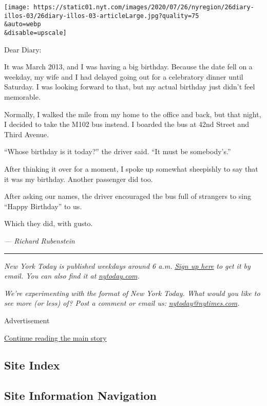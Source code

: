 \texttt{[image: https://static01.nyt.com/images/2020/07/26/nyregion/26diary-illos-03/26diary-illos-03-articleLarge.jpg?quality=75\\\&auto=webp\\\&disable=upscale]}

Dear Diary:

It was March 2013, and I was having a big birthday. Because the date
fell on a weekday, my wife and I had delayed going out for a celebratory
dinner until Saturday. I was looking forward to that, but my actual
birthday just didn't feel memorable.

Normally, I walked the mile from my home to the office and back, but
that night, I decided to take the M102 bus instead. I boarded the bus at
42nd Street and Third Avenue.

``Whose birthday is it today?'' the driver said. ``It must be
somebody's.''

After thinking it over for a moment, I spoke up somewhat sheepishly to
say that it was my birthday. Another passenger did too.

After asking our names, the driver encouraged the bus full of strangers
to sing ``Happy Birthday'' to us.

Which they did, with gusto.

\emph{--- Richard Rubenstein}

\begin{center}\rule{0.5\linewidth}{\linethickness}\end{center}

\emph{New York Today is published weekdays around 6 a.m.}
\href{https://www.nytimes.com/newsletters/newyorktoday?module=inline}{\emph{Sign
up here}} \emph{to get it by email. You can also find it at}
\href{http://www.nytoday.com/}{\emph{nytoday.com}}\emph{.}

\emph{We're experimenting with the format of New York Today. What would
you like to see more (or less) of? Post a comment or email us:}
\href{mailto:nytoday@nytimes.com}{\emph{nytoday@nytimes.com}}\emph{.}

Advertisement

\protect\hyperlink{after-bottom}{Continue reading the main story}

\hypertarget{site-index}{%
\subsection{Site Index}\label{site-index}}

\hypertarget{site-information-navigation}{%
\subsection{Site Information
Navigation}\label{site-information-navigation}}

